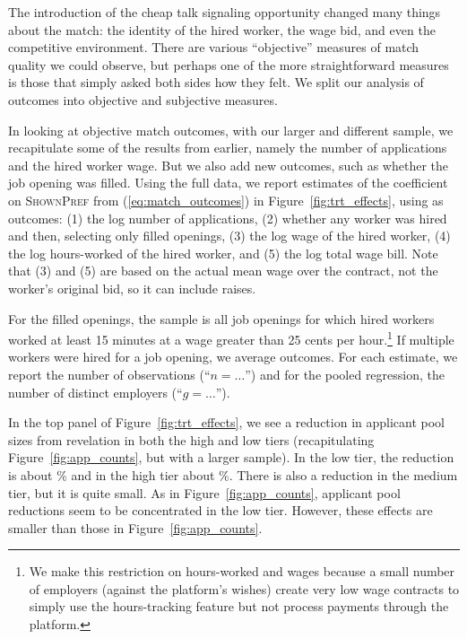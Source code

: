 \documentclass[12pt]{article}
\makeatletter
\renewcommand{\subsection}{%
  \@startsection{subsection}{2}{\z@}%
  {-3.25ex plus -1ex minus -.2ex}%
  {1.5ex plus .2ex}%
  {\normalfont\large\bfseries}%
}
\makeatother
\begin{document}
The introduction of the cheap talk signaling opportunity changed many things about the match: the identity of the hired worker, the wage bid, and even the competitive environment. 
There are various ``objective'' measures of match quality we could observe, but perhaps one of the more straightforward measures is those that simply asked both sides how they felt. 
We split our analysis of outcomes into objective and subjective measures.

In looking at objective match outcomes, with our larger and different sample, we recapitulate some of the results from earlier, namely the number of applications and the hired worker wage. 
But we also add new outcomes, such as whether the job opening was filled. 
Using the full data, we report estimates of the coefficient on {\textsc{ShownPref}} from (\ref{eq:match_outcomes}) in Figure~\ref{fig:trt_effects}, using as outcomes:
(1) the log number of applications,
(2) whether any worker was hired and 
then, selecting only filled openings, 
(3) the log wage of the hired worker,
(4) the log hours-worked of the hired worker, 
and (5) the log total wage bill.
Note that (3) and (5) are based on the actual mean wage over the contract, not the worker's original bid, so it can include raises. 

For the filled openings, the sample is all job openings for which hired workers worked at least 15 minutes at a wage greater than 25 cents per hour.\footnote{
  We make this restriction on hours-worked and wages because a small number of employers (against the platform's wishes) create very low wage contracts to simply use the hours-tracking feature but not process payments through the platform.
}
If multiple workers were hired for a job opening, we average outcomes. 
For each estimate, we report the number of observations (``$n=\ldots$'') and for the pooled regression, the number of distinct employers (``$g=\ldots$'').

In the top panel of Figure~\ref{fig:trt_effects}, we see a reduction in applicant pool sizes from revelation in both the high and low tiers (recapitulating Figure~\ref{fig:app_counts}, but with a larger sample).
In the low tier, the reduction is about \NumAppsEffectLow{}\% and in the high tier about \NumAppsEffectHigh{}\%.
There is also a reduction in the medium tier, but it is quite small. 
As in Figure~\ref{fig:app_counts}, applicant pool reductions seem to be concentrated in the low tier.
However, these effects are smaller than those in Figure~\ref{fig:app_counts}. 
\end{document}
